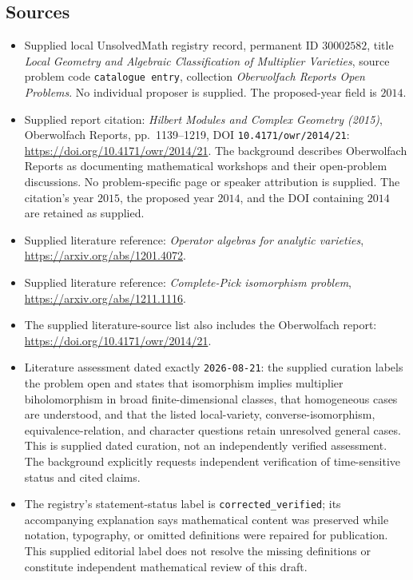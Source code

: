 \documentclass[11pt]{article}
\begin{document}
\subsection{Sources}
\begin{itemize}
\item Supplied local UnsolvedMath registry record, permanent ID \(30002582\), title \emph{Local Geometry and Algebraic Classification of Multiplier Varieties}, source problem code \texttt{catalogue entry}, collection \emph{Oberwolfach Reports Open Problems}. No individual proposer is supplied. The proposed-year field is \(2014\).
\item Supplied report citation: \emph{Hilbert Modules and Complex Geometry (2015)}, Oberwolfach Reports, pp.~1139--1219, DOI \texttt{10.4171/owr/2014/21}: \url{https://doi.org/10.4171/owr/2014/21}. The background describes Oberwolfach Reports as documenting mathematical workshops and their open-problem discussions. No problem-specific page or speaker attribution is supplied. The citation's year \(2015\), the proposed year \(2014\), and the DOI containing \(2014\) are retained as supplied.
\item Supplied literature reference: \emph{Operator algebras for analytic varieties}, \url{https://arxiv.org/abs/1201.4072}.
\item Supplied literature reference: \emph{Complete-Pick isomorphism problem}, \url{https://arxiv.org/abs/1211.1116}.
\item The supplied literature-source list also includes the Oberwolfach report: \url{https://doi.org/10.4171/owr/2014/21}.
\item Literature assessment dated exactly \texttt{2026-08-21}: the supplied curation labels the problem open and states that isomorphism implies multiplier biholomorphism in broad finite-dimensional classes, that homogeneous cases are understood, and that the listed local-variety, converse-isomorphism, equivalence-relation, and character questions retain unresolved general cases. This is supplied dated curation, not an independently verified assessment. The background explicitly requests independent verification of time-sensitive status and cited claims.
\item The registry's statement-status label is \texttt{corrected\_verified}; its accompanying explanation says mathematical content was preserved while notation, typography, or omitted definitions were repaired for publication. This supplied editorial label does not resolve the missing definitions or constitute independent mathematical review of this draft.
\end{itemize}
\end{document}
